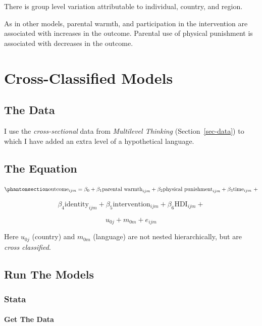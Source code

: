 \documentclass[
  letterpaper,
  DIV=11,
  numbers=noendperiod]{scrreprt}
\let\oldparagraph\paragraph
\renewcommand{\paragraph}[1]{\oldparagraph{#1}\mbox{}}
\begin{document}
There is group level variation attributable to individual, country, and
region.

As in other models, parental warmth, and participation in the
intervention are associated with increases in the outcome. Parental use
of physical punishment is associated with decreases in the outcome.

\section{Cross-Classified Models}\label{cross-classified-models}

\subsection{The Data}\label{the-data-3}

I use the \emph{cross-sectional} data from \emph{Multilevel Thinking}
(Section~\ref{sec-data}) to which I have added an extra level of a
hypothetical language.

\subsection{The Equation}\label{the-equation-6}

\begin{equation}\phantomsection\label{eq-crossclassified-multilingual}{\text{outcome}_{ijm} = \beta_0 + \beta_1 \text{parental warmth}_{ijm} + \beta_2 \text{physical punishment}_{ijm} + \beta_3 \text{time}_{ijm} \ + }\end{equation}

\[\beta_4 \text{identity}_{ijm} + \beta_5 \text{intervention}_{ijm} + \beta_6 \text{HDI}_{ijm} +\]

\[u_{0j} + m_{0m} + e_{ijm}\]

Here \(u_{0j}\) (country) and \(m_{0m}\) (language) are not nested
hierarchically, but are \emph{cross classified}.

\subsection{Run The Models}\label{run-the-models-6}

\subsubsection{Stata}

\paragraph{Get The Data}\label{get-the-data-11}
\end{document}
